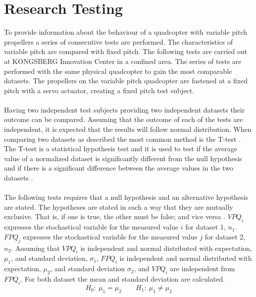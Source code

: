\section{Research Testing}
To provide information about the behaviour of a quadcopter with variable pitch propellers a series of consecutive tests are performed. The characteristics of variable pitch are compared with fixed pitch. The following tests are carried out at KONGSBERG Innovation Center in a confined area. The series of tests are performed with the same physical quadcopter to gain the most comparable datasets. The propellers on the variable pitch quadcopter are fastened at a fixed pitch with a servo actuator, creating a fixed pitch test subject. \\
\\
Having two independent test subjects providing two independent datasets their outcome can be compared. Assuming that the outcome of each of the tests are independent, it is expected that the results will follow normal distribution. When comparing two datasets as described the most common method is the T-test \cite{statistikk}. The T-test is a statistical hypothesis test and it is used to test if the average value of a normalized dataset is significantly different from the null hypothesis and if there is a significant difference between the average values in the two datasets \cite{statistikk2}.\\
\\
The following tests requires that a null hypothesis and an alternative hypothesis are stated. The hypotheses are stated in such a way that they are mutually exclusive. That is, if one is true, the other must be false; and vice versa \cite{statistikk4}. $VPQ_i$ expresses the stochastical variable for the measured value $i$ for dataset 1, $n_1$. $FPQ_j$ expresses the stochastical variable for the measured value $j$ for dataset 2, $n_2$. Assuming that $VPQ_i$ is independent and normal distributed with expectation, $\mu_1$, and standard deviation, $\sigma_1$,  $FPQ_i$ is independent and normal distributed with expectation, $\mu_2$, and standard deviation $\sigma_2$, and $VPQ_i$ are independent from $FPQ_i$. For both dataset the mean and standard deviation are calculated. 
$$H_0:\: \mu_1 = \mu_2 \quad \quad H_1:\: \mu_1 \neq \mu_2$$


